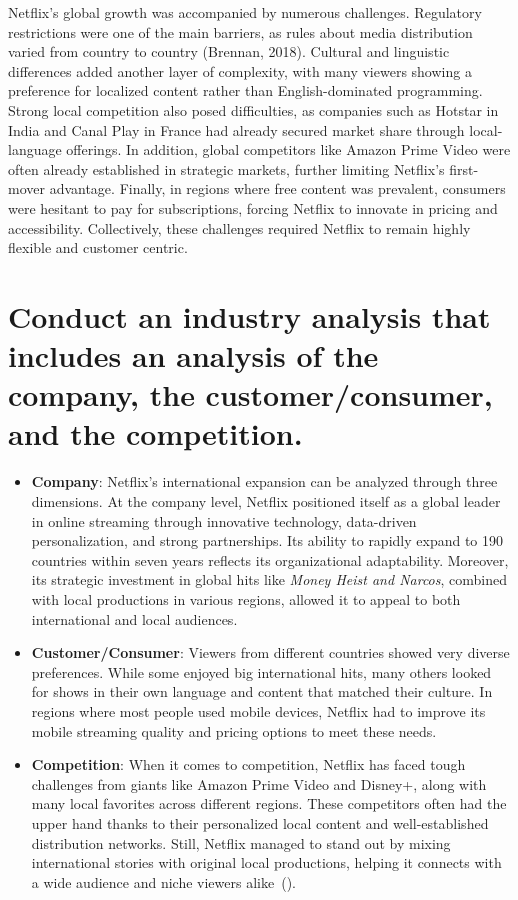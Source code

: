 \documentclass[letterpaper, 12pt]{report}
\begin{document}
Netflix’s global growth was accompanied by numerous challenges. Regulatory
restrictions were one of the main barriers, as rules about media distribution
varied from country to country (Brennan, 2018). Cultural and linguistic
differences added another layer of complexity, with many viewers showing a
preference for localized content rather than English-dominated programming.
Strong local competition also posed difficulties, as companies such as Hotstar
in India and Canal Play in France had already secured market share through
local-language offerings. In addition, global competitors like Amazon Prime
Video were often already established in strategic markets, further limiting
Netflix’s first-mover advantage. Finally, in regions where free content was
prevalent, consumers were hesitant to pay for subscriptions, forcing Netflix to
innovate in pricing and accessibility. Collectively, these challenges required
Netflix to remain highly flexible and customer centric.

\section{Conduct an industry analysis that includes an analysis of the company, the customer/consumer, and the competition.}

\begin{itemize}
    \item \textbf{Company}: Netflix’s international expansion can be analyzed through three dimensions. At the company level, Netflix positioned itself as a global leader in online streaming through innovative technology, data-driven personalization, and strong partnerships. Its ability to rapidly expand to 190 countries within seven years reflects its organizational adaptability. Moreover, its strategic investment in global hits like \textit{Money Heist and Narcos}, combined with local productions in various regions, allowed it to appeal to both international and local audiences.

    \item \textbf{Customer/Consumer}: Viewers from different countries showed very diverse
          preferences. While some enjoyed big international hits, many others looked for
          shows in their own language and content that matched their culture. In regions
          where most people used mobile devices, Netflix had to improve its mobile
          streaming quality and pricing options to meet these needs.

    \item \textbf{Competition}: When it comes to competition, Netflix has faced tough challenges
          from giants like Amazon Prime Video and Disney+, along with many local
          favorites across different regions. These competitors often had the upper hand
          thanks to their personalized local content and well-established distribution
          networks. Still, Netflix managed to stand out by mixing international stories
          with original local productions, helping it connects with a wide audience and
          niche viewers alike~(\cite{brennan2018netflix}).

\end{itemize}
\end{document}
